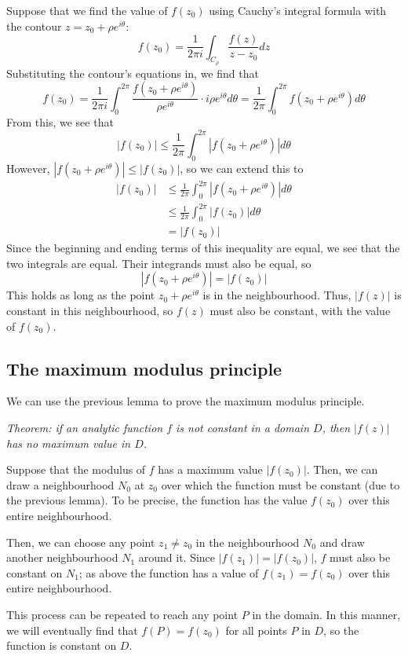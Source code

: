 \documentclass{article}
\begin{document}
Suppose that we find the value of $f(z_0)$ using Cauchy's integral formula with the contour $z = z_0 + \rho e^{i\theta}$:
\[
	f(z_0) = \frac{1}{2\pi i} \int_{C_\rho} \frac{f(z)}{z - z_0} dz
\]
Substituting the contour's equations in, we find that
\[
	f(z_0) = \frac{1}{2\pi i} \int_0^{2\pi} 
		\frac{f(z_0 + \rho e^{i\theta})}{\rho e^{i\theta}} 
		\cdot i\rho e^{i\theta} d\theta
	= \frac{1}{2\pi} \int_0^{2\pi} f(z_0 + \rho e^{i\theta}) d\theta
\]
From this, we see that
\[
	|f(z_0)| \le \frac{1}{2\pi} \int_0^{2\pi} |f(z_0 + \rho e^{i\theta})| d\theta
\]
However, $|f(z_0 + \rho e^{i\theta})| \le |f(z_0)|$, so we can extend this to
\begin{align*}
	|f(z_0)| 
	&\le \frac{1}{2\pi} \int_0^{2\pi} |f(z_0 + \rho e^{i\theta})| d\theta \\
	&\le \frac{1}{2\pi} \int_0^{2\pi} |f(z_0)| d\theta \\
	&= |f(z_0)|
\end{align*}
Since the beginning and ending terms of this inequality are equal, we see that the two integrals are equal. Their integrands must also be equal, so
\[
	|f(z_0 + \rho e^{i\theta})| = |f(z_0)|
\]
This holds as long as the point $z_0 + \rho e^{i\theta}$ is in the neighbourhood. Thus, $|f(z)|$ is constant in this neighbourhood, so $f(z)$ must also be constant, with the value of $f(z_0)$.

\subsection{The maximum modulus principle}
We can use the previous lemma to prove the maximum modulus principle.

\textit{Theorem: if an analytic function $f$ is not constant in a domain $D$, then $|f(z)|$ has no maximum value in $D$.}

Suppose that the modulus of $f$ has a maximum value $|f(z_0)|$. Then, we can draw a neighbourhood $N_0$ at $z_0$ over which the function must be constant (due to the previous lemma). To be precise, the function has the value $f(z_0)$ over this entire neighbourhood.

Then, we can choose any point $z_1 \ne z_0$ in the neighbourhood $N_0$ and draw another neighbourhood $N_1$ around it. Since $|f(z_1)| = |f(z_0)|$, $f$ must also be constant on $N_1$; as above the function has a value of $f(z_1) = f(z_0)$ over this entire neighbourhood.

This process can be repeated to reach any point $P$ in the domain. In this manner, we will eventually find that $f(P) = f(z_0)$ for all points $P$ in $D$, so the function is constant on $D$.
\end{document}
